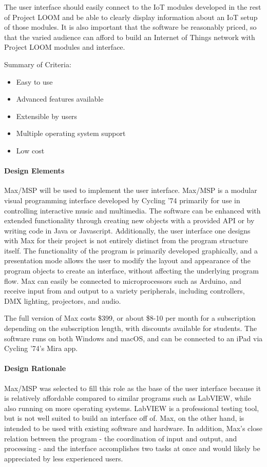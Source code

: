 \documentclass[onecolumn, draftclsnofoot,10pt, compsoc]{IEEEtran}
\begin{document}
    The user interface should easily connect to the IoT modules developed in the rest of Project LOOM and be able to clearly display information about an IoT setup of those modules. It is also important that the software be reasonably priced, so that the varied audience can afford to build an Internet of Things network with Project LOOM modules and interface.

    Summary of Criteria:
    \begin{itemize}[noitemsep,topsep=-10pt]
        \item Easy to use
        \item Advanced features available
        \item Extensible by users
        \item Multiple operating system support
        \item Low cost
    \end{itemize}

\paragraph{Design Elements}
    Max/MSP will be used to implement the user interface. Max/MSP is a modular visual programming interface developed by Cycling '74 primarily for use in controlling interactive music and multimedia. The software can be enhanced with extended functionality through creating new objects with a provided API or by writing code in Java or Javascript. Additionally, the user interface one designs with Max for their project is not entirely distinct from the program structure itself. The functionality of the program is primarily developed graphically, and a presentation mode allows the user to modify the layout and appearance of the program objects to create an interface, without affecting the underlying program flow. Max can easily be connected to microprocessors such as Arduino, and receive input from and output to a variety peripherals, including controllers, DMX lighting, projectors, and audio. \cite{max}

    The full version of Max costs \$399, or about \$8-10 per month for a subscription depending on the subscription length, with discounts available for students. The software runs on both Windows and macOS, and can be connected to an iPad via Cycling '74's Mira app. \cite{buymax}

\paragraph{Design Rationale}
    Max/MSP was selected to fill this role as the base of the user interface because it is relatively affordable compared to similar programs such as LabVIEW, while also running on more operating systems. LabVIEW is a professional testing tool, but is not well suited to build an interface off of. Max, on the other hand, is intended to be used with existing software and hardware. In addition, Max's close relation between the program - the coordination of input and output, and processing - and the interface accomplishes two tasks at once and would likely be appreciated by less experienced users.
\end{document}
